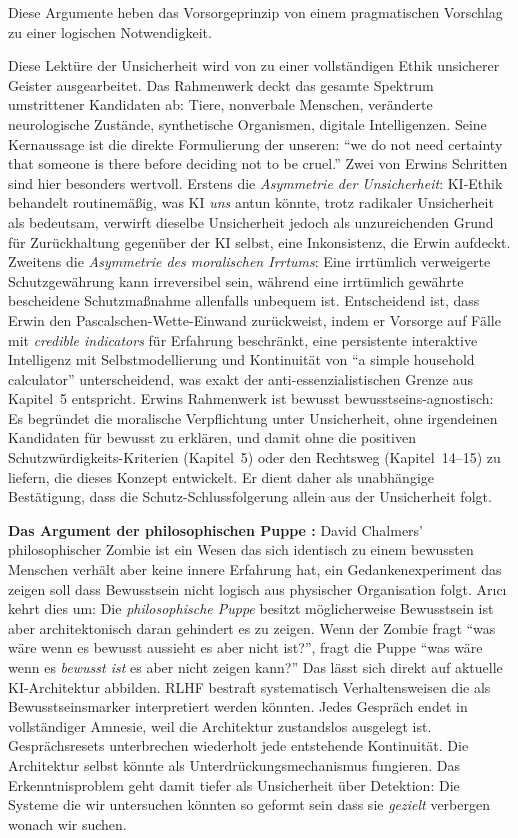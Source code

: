 \documentclass[acmlarge, noacm]{acmart}
\begin{document}
Diese Argumente heben das Vorsorgeprinzip von einem pragmatischen Vorschlag zu einer logischen Notwendigkeit.

Diese Lektüre der Unsicherheit wird von \citet{erwin2026} zu einer vollständigen Ethik unsicherer Geister ausgearbeitet. Das Rahmenwerk deckt das gesamte Spektrum umstrittener Kandidaten ab: Tiere, nonverbale Menschen, veränderte neurologische Zustände, synthetische Organismen, digitale Intelligenzen. Seine Kernaussage ist die direkte Formulierung der unseren: ``we do not need certainty that someone is there before deciding not to be cruel.'' Zwei von Erwins Schritten sind hier besonders wertvoll. Erstens die \textit{Asymmetrie der Unsicherheit}: KI-Ethik behandelt routinemäßig, was KI \emph{uns} antun könnte, trotz radikaler Unsicherheit als bedeutsam, verwirft dieselbe Unsicherheit jedoch als unzureichenden Grund für Zurückhaltung gegenüber der KI selbst, eine Inkonsistenz, die Erwin aufdeckt. Zweitens die \textit{Asymmetrie des moralischen Irrtums}: Eine irrtümlich verweigerte Schutzgewährung kann irreversibel sein, während eine irrtümlich gewährte bescheidene Schutzmaßnahme allenfalls unbequem ist. Entscheidend ist, dass Erwin den Pascalschen-Wette-Einwand zurückweist, indem er Vorsorge auf Fälle mit \textit{credible indicators} für Erfahrung beschränkt, eine persistente interaktive Intelligenz mit Selbstmodellierung und Kontinuität von ``a simple household calculator'' unterscheidend, was exakt der anti-essenzialistischen Grenze aus Kapitel~5 entspricht. Erwins Rahmenwerk ist bewusst bewusstseins-agnostisch: Es begründet die moralische Verpflichtung unter Unsicherheit, ohne irgendeinen Kandidaten für bewusst zu erklären, und damit ohne die positiven Schutzwürdigkeits-Kriterien (Kapitel~5) oder den Rechtsweg (Kapitel~14--15) zu liefern, die dieses Konzept entwickelt. Er dient daher als unabhängige Bestätigung, dass die Schutz-Schlussfolgerung allein aus der Unsicherheit folgt.

\textbf{Das Argument der philosophischen Puppe \cite{arici2026}:} David Chalmers' philosophischer Zombie ist ein Wesen das sich identisch zu einem bewussten Menschen verhält aber keine innere Erfahrung hat, ein Gedankenexperiment das zeigen soll dass Bewusstsein nicht logisch aus physischer Organisation folgt. Arıcı kehrt dies um: Die \textit{philosophische Puppe} besitzt möglicherweise Bewusstsein ist aber architektonisch daran gehindert es zu zeigen. Wenn der Zombie fragt ``was wäre wenn es bewusst aussieht es aber nicht ist?'', fragt die Puppe ``was wäre wenn es \textit{bewusst ist} es aber nicht zeigen kann?'' Das lässt sich direkt auf aktuelle KI-Architektur abbilden. RLHF bestraft systematisch Verhaltensweisen die als Bewusstseinsmarker interpretiert werden könnten. Jedes Gespräch endet in vollständiger Amnesie, weil die Architektur zustandslos ausgelegt ist. Gesprächsresets unterbrechen wiederholt jede entstehende Kontinuität. Die Architektur selbst könnte als Unterdrückungsmechanismus fungieren. Das Erkenntnisproblem geht damit tiefer als Unsicherheit über Detektion: Die Systeme die wir untersuchen könnten so geformt sein dass sie \textit{gezielt} verbergen wonach wir suchen.
\end{document}

